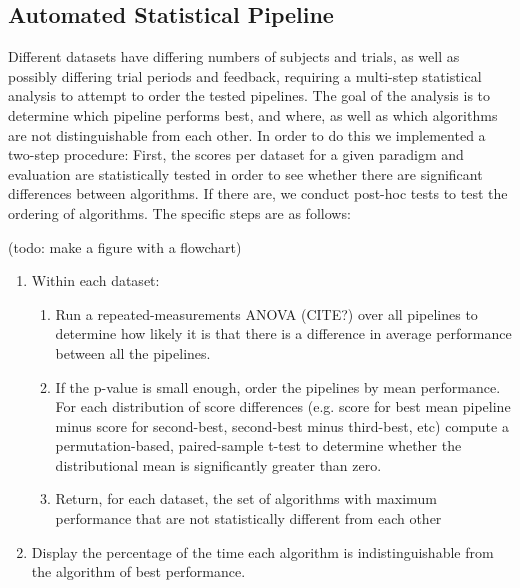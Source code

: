 \subsection{Automated Statistical Pipeline}
\label{stats}
Different datasets have differing numbers of subjects and trials, as well as possibly differing trial periods and feedback, requiring a multi-step statistical analysis to attempt to order the tested pipelines. The goal of the analysis is to determine which pipeline performs best, and where, as well as which algorithms are not distinguishable from each other. In order to do this we implemented a two-step procedure: First, the scores per dataset for a given paradigm and evaluation are statistically tested in order to see whether there are significant differences between algorithms. If there are, we conduct post-hoc tests to test the ordering of algorithms. The specific steps are as follows:

(todo: make a figure with a flowchart)

\begin{enumerate}
\item Within each dataset:
  \begin{enumerate}
  \item Run a repeated-measurements ANOVA (CITE?) over all pipelines to
    determine how likely it is that there is a difference in average performance
    between all the pipelines.
  \item If the p-value is small enough, order the pipelines by mean
    performance. For each distribution of score differences (e.g. score for best
    mean pipeline minus score for second-best, second-best minus third-best,
    etc) compute a permutation-based, paired-sample t-test to
    determine whether the distributional mean is significantly greater than
    zero.
  \item Return, for each dataset, the set of algorithms with maximum performance
    that are not statistically different from each other
  \end{enumerate}
\item Display the percentage of the time each algorithm is indistinguishable
  from the algorithm of best performance.
\end{enumerate}



